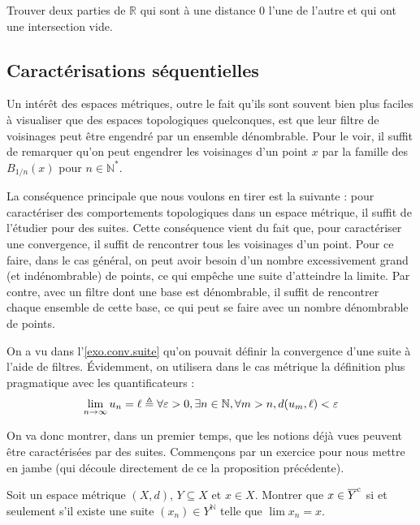 \begin{exercise}
  Trouver deux parties de $\mathbb R$ qui sont à une distance $0$ l'une de
  l'autre et qui ont une intersection vide.
\end{exercise}

\subsection{Caractérisations séquentielles}

Un intérêt des espaces métriques, outre le fait qu'ils sont souvent bien plus
faciles à visualiser que des espaces topologiques quelconques, est que leur
filtre de voisinages peut être engendré par un ensemble dénombrable. Pour le
voir, il suffit de remarquer qu'on peut engendrer les voisinages d'un point
$x$ par la famille des $B_{1/n}(x)$ pour $n \in \mathbb N^*$.

La conséquence principale que nous voulons en tirer est la suivante : pour
caractériser des comportements topologiques dans un espace métrique, il suffit
de l'étudier pour des suites. Cette conséquence vient du fait que, pour
caractériser une convergence, il suffit de rencontrer tous les voisinages d'un
point. Pour ce faire, dans le cas général, on peut avoir besoin d'un nombre
excessivement grand (et indénombrable) de points, ce qui empêche une suite
d'atteindre la limite. Par contre, avec un filtre dont une base est
dénombrable, il suffit de rencontrer chaque ensemble de cette base, ce qui peut
se faire avec un nombre dénombrable de points.

On a vu dans l'\cref{exo.conv.suite} qu'on pouvait définir la convergence
d'une suite à l'aide de filtres. \'Evidemment, on utilisera dans le cas
métrique la définition plus pragmatique avec les quantificateurs :
\[\lim_{n \to \infty} u_n = \ell \triangleq \forall \varepsilon > 0,
\exists n \in \mathbb N, \forall m > n, d(u_m,\ell) < \varepsilon\]

On va donc montrer, dans un premier temps, que les notions déjà vues peuvent
être caractérisées par des suites. Commençons par un exercice pour nous mettre
en jambe (qui découle directement de ce la proposition précédente).

\begin{exercise}
  Soit un espace métrique $(X,d)$, $Y\subseteq X$ et $x\in X$. Montrer que
  $x\in \overline{Y}^{\mathrm c}$ si et seulement s'il existe une suite
  $(x_n)\in Y^\mathbb N$ telle que $\lim x_n = x$.
\end{exercise}

